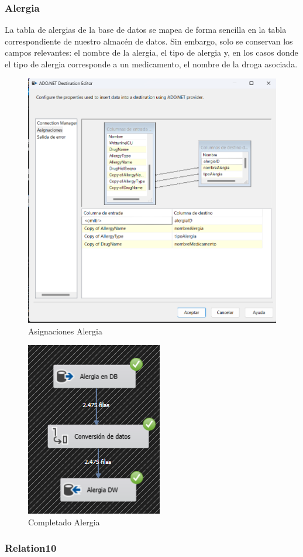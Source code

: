 \documentclass{article}
\begin{document}
	\subsubsection{Alergia}
	La tabla de alergias de la base de datos se mapea de forma sencilla en la tabla correspondiente de nuestro almacén de datos. Sin embargo, solo se conservan los campos relevantes: el nombre de la alergia, el tipo de alergia y, en los casos donde el tipo de alergia corresponde a un medicamento, el nombre de la droga asociada.
	\begin{figure}[H]
		\centering
		\includegraphics[width=.7\linewidth]{./images/asignaciones/alergia.png}
		\caption{Asignaciones Alergia}
	\end{figure}
	\begin{figure}[H]
		\centering
		\includegraphics[width=.3\linewidth]{./images/completados/alergia.png}
		\caption{Completado Alergia}
	\end{figure}
	\subsubsection{Relation10}
	
\end{document}
